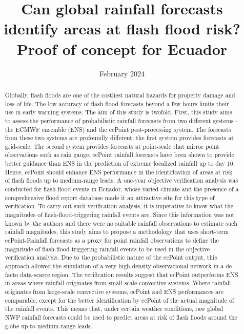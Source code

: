 \documentclass[techmemo]{ecmwfrep}%
\title{Can global rainfall forecasts identify areas at flash flood risk? Proof of concept for Ecuador}
\date{February 2024}
\begin{document}
\maketitle

\begin{abstract}
Globally, flash floods are one of the costliest natural hazards for property damage and loss of life. The low accuracy of flash flood forecasts beyond a few hours limits their use in early warning systems.    The aim of this study is twofold. First, this study aims to assess the performance of probabilistic rainfall forecasts from two different systems - the ECMWF ensemble (ENS) and the ecPoint post-processing system. The forecasts from these two systems are profoundly different: the first system provides forecasts at grid-scale. The second system provides forecasts at point-scale that mirror point observations such as rain gauge. ecPoint rainfall forecasts have been shown to provide better guidance than ENS in the prediction of extreme localized rainfall up to day 10. Hence, ecPoint should enhance ENS performance in the identification of areas at risk of flash floods up to medium-range leads. A one-year objective verification analysis was conducted for flash flood events in Ecuador, whose varied climate and the presence of a comprehensive flood report database made it an attractive site for this type of verification. To carry out such verification analysis, it is imperative to know what the magnitudes of flash-flood-triggering rainfall events are. Since this information was not known by the authors and there were no suitable rainfall observations to estimate such rainfall magnitudes, this study aims to propose a methodology that uses short-term ecPoint-Rainfall forecasts as a proxy for point rainfall observations to define the magnitude of flash-flood-triggering rainfall events to be used in the objective verification analysis. Due to the probabilistic nature of the ecPoint output, this approach allowed the simulation of a very high-density observational network in a de facto data-scarce region. The verification results suggest that ecPoint outperforms ENS in areas where rainfall originates from small-scale convective systems. Where rainfall originates from large-scale convective systems, ecPoint and ENS performances are comparable, except for the better identification by ecPoint of the actual magnitude of the rainfall events. This means that, under certain weather conditions, raw global NWP rainfall forecasts could be used to predict areas at risk of flash floods around the globe up to medium-range leads.  

\end{abstract}
\end{document}
